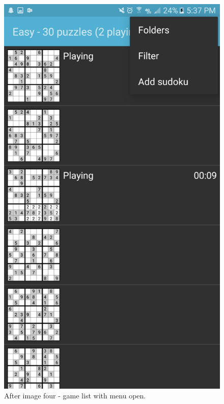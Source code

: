 \documentclass[10pt]{article}
\begin{document}
\begin{figure}
\includegraphics[width=\linewidth]{img/after4.png}
\caption{After image four - game list with menu open.}
\end{figure}
\end{document}
